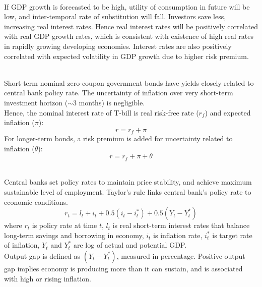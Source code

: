 \begin{remark} \\
If GDP growth is forecasted to be high, utility of consumption in future will be low, and inter-temporal rate of substitution will fall. Investors save less, increasing real interest rates. Hence real interest rates will be positively correlated with real GDP growth rates, which is consistent with existence of high real rates in rapidly growing developing economies. Interest rates are also positively correlated with expected volatility in GDP growth due to higher risk premium.
\end{remark}

\begin{remark} \\
Short-term nominal zero-coupon government bonds have yields closely related to central bank policy rate. The uncertainty of inflation over very short-term investment horizon ($\sim 3$ months) is negligible.\\
Hence, the nominal interest rate of T-bill is real risk-free rate ($r_f$) and expected inflation ($\pi$):
\begin{equation}
r = r_f + \pi \nonumber
\end{equation}
For longer-term bonds, a risk premium is added for uncertainty related to inflation ($\theta$):
\begin{equation}
r = r_f + \pi + \theta \nonumber
\end{equation}
\end{remark}

\begin{remark} \\
Central banks set policy rates to maintain price stability, and achieve maximum sustainable level of employment. Taylor's rule links central bank's policy rate to economic conditions.
\begin{equation}
r_t = l_t + i_t + 0.5(i_t - i_t^{*}) + 0.5(Y_t - Y_t^{*}) \nonumber
\end{equation}
where $r_t$ is policy rate at time $t$, $l_t$ is real short-term interest rates that balance long-term savings and borrowing in economy, $i_t$ is inflation rate, $i_t^{*}$ is target rate of inflation, $Y_t$ and $Y_t^{*}$ are log of actual and potential GDP.\\
Output gap is defined as $(Y_t - Y_t^{*})$, measured in percentage. Positive output gap implies economy is producing more than it can sustain, and is associated with high or rising inflation.
\end{remark}

